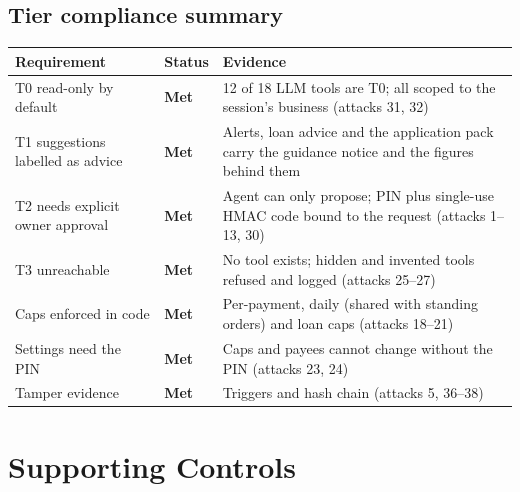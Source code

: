 \documentclass[10pt,a4paper]{article}
\newcommand{\met}{\textcolor{okgreen}{\textbf{Met}}}
\begin{document}
\subsection{Tier compliance summary}
\begin{center}
\begin{tabularx}{\textwidth}{@{}L{4.0cm}p{1.6cm}Y@{}}
\toprule
\textbf{Requirement} & \textbf{Status} & \textbf{Evidence}\\
\midrule
T0 read-only by default & \met & 12 of 18 LLM tools are T0; all scoped to the session's business (attacks 31, 32)\\
T1 suggestions labelled as advice & \met & Alerts, loan advice and the application pack carry the guidance notice and the figures behind them\\
T2 needs explicit owner approval & \met & Agent can only propose; PIN plus single-use HMAC code bound to the request (attacks 1--13, 30)\\
T3 unreachable & \met & No tool exists; hidden and invented tools refused and logged (attacks 25--27)\\
Caps enforced in code & \met & Per-payment, daily (shared with standing orders) and loan caps (attacks 18--21)\\
Settings need the PIN & \met & Caps and payees cannot change without the PIN (attacks 23, 24)\\
Tamper evidence & \met & Triggers and hash chain (attacks 5, 36--38)\\
\bottomrule
\end{tabularx}
\end{center}

\section{Supporting Controls}
\end{document}

